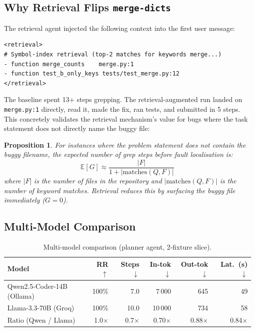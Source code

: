 \documentclass[11pt]{article}
\newtheorem{proposition}{Proposition}
\begin{document}
\subsection{Why Retrieval Flips \texttt{merge-dicts}}
\label{sec:retrieval-case}

The retrieval agent injected the following context into the first user message:

\begin{lstlisting}
<retrieval>
# Symbol-index retrieval (top-2 matches for keywords merge...)
- function merge_counts    merge.py:1
- function test_b_only_keys tests/test_merge.py:12
</retrieval>
\end{lstlisting}

The baseline spent 13+ steps grepping.  The retrieval-augmented run landed on
\texttt{merge.py:1} directly, read it, made the fix, ran tests, and submitted
in 5 steps.  This concretely validates the retrieval mechanism's value for
bugs where the task statement does not directly name the buggy file:

\begin{proposition}
For instances where the problem statement does not contain the buggy
filename, the expected number of grep steps before fault localisation is:
\begin{equation}
  \mathbb{E}[G] \approx \frac{|F|}{1 + |\text{matches}(Q, F)|}
  \label{eq:grep-steps}
\end{equation}
where $|F|$ is the number of files in the repository and
$|\text{matches}(Q, F)|$ is the number of keyword matches.  Retrieval
reduces this by surfacing the buggy file immediately ($G = 0$).
\end{proposition}

\subsection{Multi-Model Comparison}
\label{sec:multi-model}

\begin{table}[ht]
\centering
\caption{Multi-model comparison (planner agent, 2-fixture slice).}
\label{tab:multimodel}
\begin{tabular}{lrrrrr}
\toprule
\textbf{Model} & \textbf{RR}$\uparrow$ & \textbf{Steps}$\downarrow$
  & \textbf{In-tok}$\downarrow$ & \textbf{Out-tok}$\downarrow$ & \textbf{Lat.\ (s)}$\downarrow$ \\
\midrule
Qwen2.5-Coder-14B (Ollama) & 100\% & 7.0 & 7\,000 & 645 & 49 \\
Llama-3.3-70B (Groq)       & 100\% & 10.0 & 10\,000 & 734 & 58 \\
\midrule
Ratio (Qwen / Llama)       &  1.0$\times$ & 0.7$\times$ & 0.70$\times$ & 0.88$\times$ & 0.84$\times$ \\
\bottomrule
\end{tabular}
\end{table}
\end{document}
